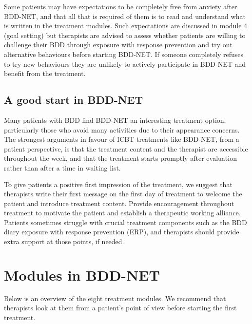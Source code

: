 \documentclass[]{book}
\theoremstyle{definition}
\theoremstyle{definition}
\theoremstyle{definition}
\theoremstyle{remark}
\begin{document}
Some patients may have expectations to be completely free from anxiety
after BDD-NET, and that all that is required of them is to read and
understand what is written in the treatment modules. Such expectations
are discussed in module 4 (goal setting) but therapists are advised to
assess whether patients are willing to challenge their BDD through
exposure with response prevention and try out alternative behaviours
before starting BDD-NET. If someone completely refuses to try new
behaviours they are unlikely to actively participate in BDD-NET and
benefit from the treatment.

\hypertarget{a-good-start-in-bdd-net}{%
\subsection{A good start in BDD-NET}\label{a-good-start-in-bdd-net}}

Many patients with BDD find BDD-NET an interesting treatment option,
particularly those who avoid many activities due to their appearance
concerns. The strongest arguments in favour of ICBT treatments like
BDD-NET, from a patient perspective, is that the treatment content and
the therapist are accessible throughout the week, and that the treatment
starts promptly after evaluation rather than after a time in waiting
list.

To give patients a positive first impression of the treatment, we
suggest that therapists write their first message on the first day of
treatment to welcome the patient and introduce treatment content.
Provide encouragement throughout treatment to motivate the patient and
establish a therapeutic working alliance. Patients sometimes struggle
with crucial treatment components such as the BDD diary exposure with
response prevention (ERP), and therapists should provide extra support
at those points, if needed.

\hypertarget{modules-in-bdd-net}{%
\section{Modules in BDD-NET}\label{modules-in-bdd-net}}

Below is an overview of the eight treatment modules. We recommend that
therapists look at them from a patient's point of view before starting
the first treatment.
\end{document}
